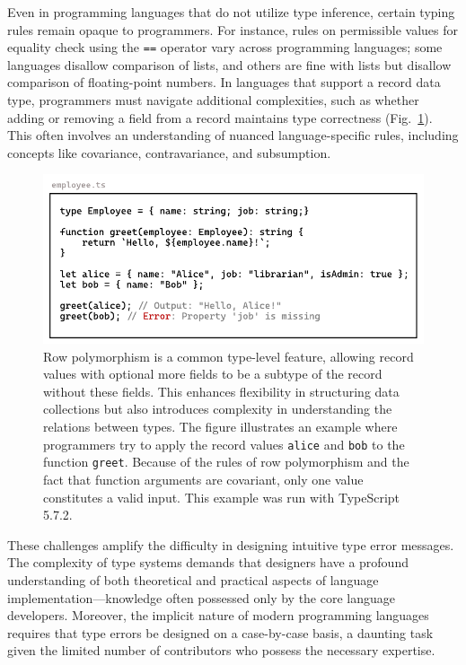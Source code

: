 Even in programming languages that do not utilize type inference, certain typing rules remain opaque to programmers. For instance, rules on permissible values for equality check using the \texttt{==} operator vary across programming languages; some languages disallow comparison of lists, and others are fine with lists but disallow comparison of floating-point numbers. In languages that support a record data type, programmers must navigate additional complexities, such as whether adding or removing a field from a record maintains type correctness (Fig.~\ref{fig:row-polymophism}). This often involves an understanding of nuanced language-specific rules, including concepts like covariance, contravariance, and subsumption.

\begin{figure}[htbp]
  \centering
  \includegraphics[width=\linewidth]{RowPolymorphism.pdf}
  \caption[An example of a correct usage and a wrong usage of row polymorphism in TypeScript]{
    \label{fig:row-polymophism}
Row polymorphism is a common type-level feature, allowing record values with optional more fields to be a subtype of the record without these fields. This enhances flexibility in structuring data collections but also introduces complexity in understanding the relations between types. The figure illustrates an example where programmers try to apply the record values \texttt{alice} and \texttt{bob} to the function \texttt{greet}. Because of the rules of row polymorphism and the fact that function arguments are covariant, only one value constitutes a valid input. This example was run with TypeScript 5.7.2.
    }
\end{figure}

These challenges amplify the difficulty in designing intuitive type error messages. The complexity of type systems demands that designers have a profound understanding of both theoretical and practical aspects of language implementation—knowledge often possessed only by the core language developers. Moreover, the implicit nature of modern programming languages requires that type errors be designed on a case-by-case basis, a daunting task given the limited number of contributors who possess the necessary expertise.

